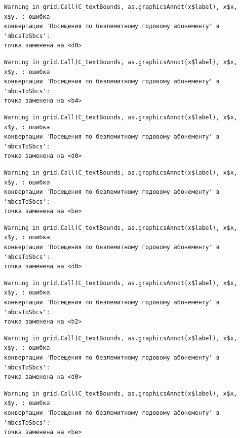 \documentclass[
  letterpaper,
  DIV=11,
  numbers=noendperiod]{scrreprt}
\begin{document}
\begin{verbatim}
Warning in grid.Call(C_textBounds, as.graphicsAnnot(x$label), x$x, x$y, : ошибка
конвертации 'Посещения по безлемитному годовому абонементу' в 'mbcsToSbcs':
точка заменена на <d0>
\end{verbatim}

\begin{verbatim}
Warning in grid.Call(C_textBounds, as.graphicsAnnot(x$label), x$x, x$y, : ошибка
конвертации 'Посещения по безлемитному годовому абонементу' в 'mbcsToSbcs':
точка заменена на <b4>
\end{verbatim}

\begin{verbatim}
Warning in grid.Call(C_textBounds, as.graphicsAnnot(x$label), x$x, x$y, : ошибка
конвертации 'Посещения по безлемитному годовому абонементу' в 'mbcsToSbcs':
точка заменена на <d0>
\end{verbatim}

\begin{verbatim}
Warning in grid.Call(C_textBounds, as.graphicsAnnot(x$label), x$x, x$y, : ошибка
конвертации 'Посещения по безлемитному годовому абонементу' в 'mbcsToSbcs':
точка заменена на <be>
\end{verbatim}

\begin{verbatim}
Warning in grid.Call(C_textBounds, as.graphicsAnnot(x$label), x$x, x$y, : ошибка
конвертации 'Посещения по безлемитному годовому абонементу' в 'mbcsToSbcs':
точка заменена на <d0>
\end{verbatim}

\begin{verbatim}
Warning in grid.Call(C_textBounds, as.graphicsAnnot(x$label), x$x, x$y, : ошибка
конвертации 'Посещения по безлемитному годовому абонементу' в 'mbcsToSbcs':
точка заменена на <b2>
\end{verbatim}

\begin{verbatim}
Warning in grid.Call(C_textBounds, as.graphicsAnnot(x$label), x$x, x$y, : ошибка
конвертации 'Посещения по безлемитному годовому абонементу' в 'mbcsToSbcs':
точка заменена на <d0>
\end{verbatim}

\begin{verbatim}
Warning in grid.Call(C_textBounds, as.graphicsAnnot(x$label), x$x, x$y, : ошибка
конвертации 'Посещения по безлемитному годовому абонементу' в 'mbcsToSbcs':
точка заменена на <be>
\end{verbatim}
\end{document}
